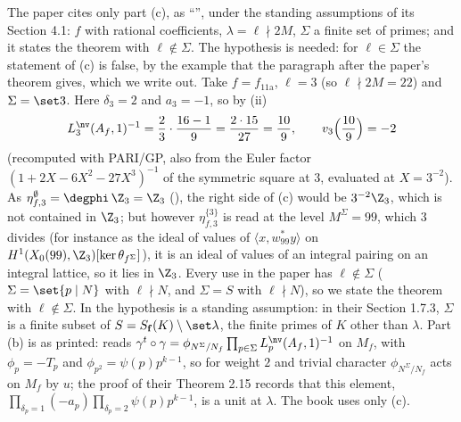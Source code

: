 \begin{remark}\label{rem:congruence:dfg14-status}
The paper cites only part (c), as ``\cite[Proposition 1.4(c)]{DFG04}'', under the standing assumptions of its Section 4.1: $f$ with rational coefficients, $\lambda=\ell\nmid2M$, $\Sigma$ a finite set of
primes; and it states the theorem with $\ell\notin\Sigma$. The hypothesis is needed: for $\ell\in\Sigma$ the statement of (c) is false, by the example that the paragraph after the paper's theorem gives, which we write out. Take $f=f_{\text{11a}}$, $\ell=3$ (so $\ell\nmid2M=22$) and
$\Sigma=\set3$. Here $\delta_3=2$ and $a_3=-1$, so by (ii)
\[
L^{\nv}_3(A_f,1)^{-1}=\frac23\cdot\frac{16-1}{9}=\frac{2\cdot15}{27}=\frac{10}9,\qquad v_3\Bigl(\frac{10}9\Bigr)=-2
\]
(recomputed with PARI/GP, also from the Euler factor $(1+2X-6X^2-27X^3)^{-1}$ of the symmetric square at $3$, evaluated at $X=3^{-2}$). As $\eta^\emptyset_{f,3}=\degphi\,\Z_3=\Z_3$
(), the right side of (c) would be $3^{-2}\Z_3$, which is not contained in $\Z_3$; but however $\eta^{\{3\}}_{f,3}$ is read at the level $M^\Sigma=99$, which $3$ divides (for instance as the
ideal of values of $\langle x,w_{99}^*y\rangle$ on $H^1(X_0(99),\Z_3)[\ker\theta_{f^\Sigma}]$), it is an ideal of values of an integral pairing on an integral lattice, so it lies in $\Z_3$. Every use in the paper has $\ell\notin\Sigma$ ($\Sigma=\set{p\mid N}$ with $\ell\nmid N$, and $\Sigma=S$ with $\ell\nmid N$), so we state the theorem with $\ell\notin\Sigma$. In \cite{DFG04} the hypothesis is a standing assumption: in their Section 1.7.3, $\Sigma$ is a finite
subset of $S=S_{\mathbf f}(K)\setminus\set\lambda$, the finite primes of $K$ other than $\lambda$. Part (b) is as printed: \cite[Proposition 1.4(b)]{DFG04} reads
$\gamma^t\circ\gamma=\phi_{N^\Sigma/N_f}\prod_{p\in\Sigma}L^{\nv}_p(A_f,1)^{-1}$ on $M_f$, with $\phi_p=-T_p$ and $\phi_{p^2}=\psi(p)p^{k-1}$, so for weight $2$ and trivial character $\phi_{N^\Sigma/N_f}$ acts on $M_f$ by $u$;
the proof of their Theorem 2.15 records that this element, $\prod_{\delta_p=1}(-a_p)\prod_{\delta_p=2}\psi(p)p^{k-1}$, is a unit at $\lambda$. The book uses only (c).
\end{remark}

